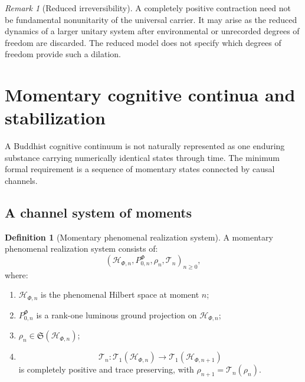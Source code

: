 \documentclass[11pt,reqno]{scrartcl}
\theoremstyle{plain}
\theoremstyle{definition}
\newtheorem{definition}[definition]{Definition}
\theoremstyle{remark}
\newtheorem{remark}[remark]{Remark}
\begin{document}
\begin{remark}[Reduced irreversibility]
\label{rem:reduced-irreversibility}
A completely positive contraction need not be fundamental nonunitarity of the
universal carrier.  It may arise as the reduced dynamics of a larger unitary
system after environmental or unrecorded degrees of freedom are discarded.
The reduced model does not specify which degrees of freedom provide such a
dilation.
\end{remark}
\section{Momentary cognitive continua and stabilization}
\label{sec:momentary-stabilization}

A Buddhist cognitive continuum is not naturally represented as one enduring
substance carrying numerically identical states through time.  The minimum
formal requirement is a sequence of momentary states connected by causal
channels.

\subsection{A channel system of moments}

\begin{definition}[Momentary phenomenal realization system]
\label{def:momentary-phenomenal-system}
A momentary phenomenal realization system consists of:
\begin{equation}
  \left(
    \mathscr H_{\Phi,n},P_{0,n}^{\Phi},\rho_n,\mathcal T_n
  \right)_{n\geq0},
  \label{eq:momentary-system-data}
\end{equation}
where:
\begin{enumerate}[label=(\roman*)]
  \item $\mathscr H_{\Phi,n}$ is the phenomenal Hilbert space at moment $n$;
  \item $P_{0,n}^{\Phi}$ is a rank-one luminous ground projection on $\mathscr H_{\Phi,n}$;
  \item $\rho_n\in\mathfrak S(\mathscr H_{\Phi,n})$;
  \item
  \begin{equation}
    \mathcal T_n:\mathcal T_1(\mathscr H_{\Phi,n})
    \longrightarrow\mathcal T_1(\mathscr H_{\Phi,n+1})
  \end{equation}
  is completely positive and trace preserving, with
  $\rho_{n+1}=\mathcal T_n(\rho_n)$.
\end{enumerate}
\end{definition}
\end{document}

